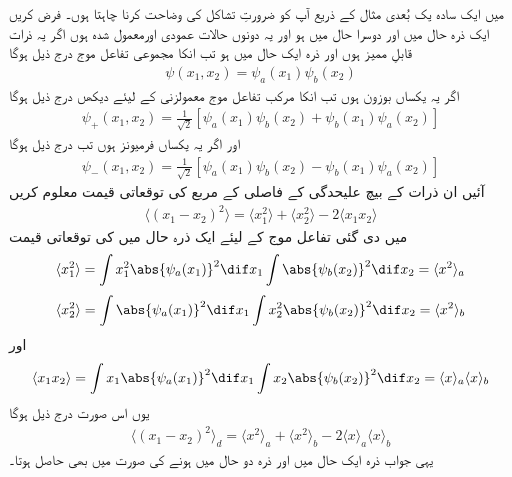 
میں ایک سادہ یک بُعدی مثال کے ذریع آپ کو ضرورتِ تشاکل کی وضاحت کرنا چاہتا ہوں۔ فرض کریں ایک ذرہ حال  میں اور دوسرا حال  میں ہو اور یہ دونوں حالات عمودی اورمعمول شدہ ہوں اگر یہ ذرات قابلِ ممیز ہوں اور ذرہ ایک حال  میں ہو تب انکا مجموعی تفاعل موج درج ذیل ہوگا
\begin{align}
	\psi(x_1, x_2)=\psi_a(x_1)\psi_b(x_2)
\end{align}
اگر یہ یکساں بوزون ہوں تب انکا مرکب تفاعل موج  معمولزنی کے لیئے دیکھں درج ذیل ہوگا
\begin{align}
	\psi_+(x_1, x_2) = \frac{1}{\sqrt{2}}[\psi_a(x_1)\psi_b(x_2)+\psi_b(x_1)\psi_a(x_2)]
\end{align}
اور اگر یہ یکساں فرمیونز ہوں تب درج ذیل ہوگا
\begin{align}
	\psi_-(x_1, x_2)=\frac{1}{\sqrt{2}}[\psi_a(x_1)\psi_b(x_2)-\psi_b(x_1)\psi_a(x_2)]
\end{align}
آئیں ان ذرات کے بیچ علیحدگی کے فاصلی کے مربع کی توقعاتی قیمت معلوم کریں
\begin{align}
	\langle(x_1-x_2)^2\rangle=\langle x^2_1\rangle+\langle x_2^2\rangle-2\langle x_1x_2\rangle
\end{align}
  میں دی گئی تفاعل موج کے لیئے ایک ذرہ حال  میں  کی توقعاتی قیمت 
\begin{align*}
	\langle x_1^2\rangle=\int x_1^2\abs{\psi_a(x_1)}^2\dif x_1\int\abs{\psi_b(x_2)}^2\dif x_2=\langle x^2\rangle_a
\end{align*}
\begin{align*}
	\langle x_2^2\rangle=\int\abs{\psi_a(x_1)}^2\dif x_1\int x_2^2\abs{\psi_b(x_2)}^2\dif x_2=\langle x^2\rangle_b
\end{align*}
اور
\begin{align*}
	\langle x_1x_2 \rangle=\int x_1\abs{\psi_a(x_1)}^2\dif x_1\int x_2\abs{\psi_b(x_2)}^2\dif x_2=\langle x\rangle_a\langle x \rangle_b
\end{align*}
یوں اس صورت درج ذیل ہوگا
\begin{align}
	\langle(x_1-x_2)^2\rangle_d=\langle x^2\rangle_a+\langle x^2 \rangle_b-2\langle x \rangle_a\langle x \rangle_b
\end{align}
یہی جواب ذرہ ایک حال  میں اور ذرہ دو حال  میں ہونے کی صورت میں بھی حاصل ہوتا۔

